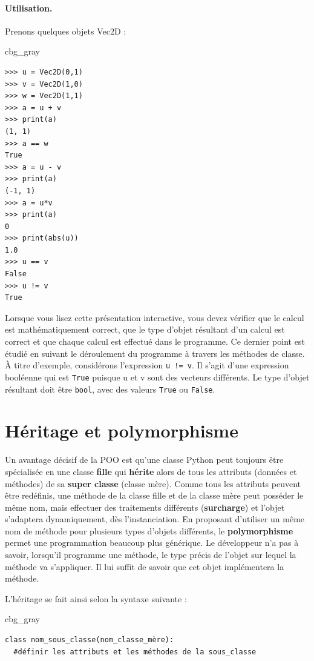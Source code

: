 \documentclass[%
oneside,                 %
final,                   %
10pt]{article}
\newenvironment{_cod_tight}[1]{
   \def\FrameCommand{\colorbox{#1}}
   \FrameRule0.6pt\MakeFramed {\FrameRestore}\vskip3mm}
   {\vskip0mm\endMakeFramed}
\newenvironment{cod}[1]{
\bgroup\rmfamily
\fboxsep=0mm\relax
\begin{_cod_tight}{#1}
\list{}{\parsep=-2mm\parskip=0mm\topsep=0pt\leftmargin=2mm
\rightmargin=2\leftmargin\leftmargin=4pt\relax}
\item\relax}
{\endlist\end{_cod_tight}\egroup}
\begin{document}
\paragraph{Utilisation.}
Prenons quelques objets Vec2D :
\begin{cod}{cbg_gray}\begin{verbatim}
>>> u = Vec2D(0,1)
>>> v = Vec2D(1,0)
>>> w = Vec2D(1,1)
>>> a = u + v
>>> print(a)
(1, 1)
>>> a == w
True
>>> a = u - v
>>> print(a)
(-1, 1)
>>> a = u*v
>>> print(a)
0
>>> print(abs(u))
1.0
>>> u == v
False
>>> u != v
True
\end{verbatim}
\end{cod}
\noindent
Lorsque vous lisez cette présentation interactive, vous devez vérifier que le calcul est mathématiquement correct, que le type d'objet résultant d'un calcul est correct et que chaque calcul est effectué dans le programme. Ce dernier point est étudié en suivant le déroulement du programme à travers les méthodes de classe. À titre d'exemple, considérons l'expression \Verb?u != v?. Il s'agit d'une expression booléenne qui est \texttt{True} puisque u et v sont des vecteurs différents. Le type d'objet résultant doit être \texttt{bool}, avec des valeurs \texttt{True} ou \texttt{False}.

\section{Héritage et polymorphisme}
Un avantage décisif de la POO est qu'une classe Python peut toujours être spécialisée en une classe \textbf{fille} qui \textbf{hérite} alors de tous les attributs (données et méthodes) de sa \textbf{super classe} (classe mère). Comme tous les attributs peuvent être redéfinis, une méthode de la classe fille et de la classe mère peut posséder le même nom, mais effectuer des traitements différents (\textbf{surcharge}) et l'objet s'adaptera dynamiquement, dès l'instanciation. En proposant d'utiliser un même nom de méthode pour plusieurs types d'objets différents, le \textbf{polymorphisme} permet une programmation beaucoup plus générique. Le développeur n'a pas à savoir, lorsqu'il programme une méthode, le type précis de l'objet sur lequel la méthode va s'appliquer. Il lui suffit de savoir que cet objet implémentera la méthode.

L'héritage se fait ainsi selon la syntaxe suivante :
\begin{cod}{cbg_gray}\begin{verbatim}
class nom_sous_classe(nom_classe_mère):
  #définir les attributs et les méthodes de la sous_classe
\end{verbatim}
\end{cod}
\noindent
\end{document}
